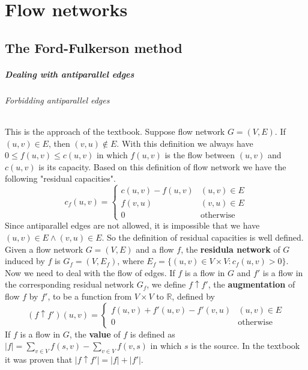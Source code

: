 \documentclass{book}
\begin{document}
	\chapter{Flow networks}
	\section{The Ford-Fulkerson method}
	\paragraph{Dealing with antiparallel edges}
	\subparagraph{Forbidding antiparallel edges}
	This is the approach of the textbook. Suppose flow network $G = (V, E)$. If $(u, v) \in E$, then $(v, u) \not\in E$. With this definition we always have $0 \le f(u, v) \le c(u, v)$ in which $f(u, v)$ is the flow between $(u, v)$ and $c(u, v)$ is its capacity. Based on this definition of flow network we have the following "residual capacities".
	\begin{equation}
	\label{eq:ResidualCapacityNoAntiParallel}
	c_f(u, v) = \begin{cases}
	c(u, v) - f(u, v) & (u, v) \in E \\
	f(v, u) & (v, u) \in E \\
	0 & \text{otherwise}
	\end{cases}
	\end{equation}
	Since antiparallel edges are not allowed, it is impossible that we have $(u, v) \in E \land (v, u) \in E$. So the definition of residual capacities is well defined. Given a flow network $G = (V, E)$ and a flow $f$, the \textbf{residula network} of $G$ induced by $f$ is $G_f = (V, E_f)$, where $E_f = \{(u, v) \in V \times V : c_f(u, v) > 0\}$.\\
	Now we need to deal with the flow of edges. If $f$ is a flow in $G$ and $f'$ is a flow in the corresponding residual network $G_f$, we define $f \uparrow f'$, the \textbf{augmentation} of flow $f$ by $f'$, to be a function from $V \times V$ to $\mathbb{R}$, defined by
	\begin{equation}
	\label{eq:augmentationOfFlowNoAntiparallel}
		(f \uparrow f')(u, v) = \begin{cases}
		f(u, v) + f'(u, v) - f'(v, u) & (u, v) \in E \\
		0 & \text{otherwise}
		\end{cases}
	\end{equation}
	If $f$ is a flow in $G$, the \textbf{value} of $f$ is defined as $|f| = \sum_{v \in V}f(s, v) - \sum_{v \in V}f(v, s)$ in which $s$ is the source. In the textbook it was proven that $|f \uparrow f'| = |f| + |f'|$.\\
\end{document}
